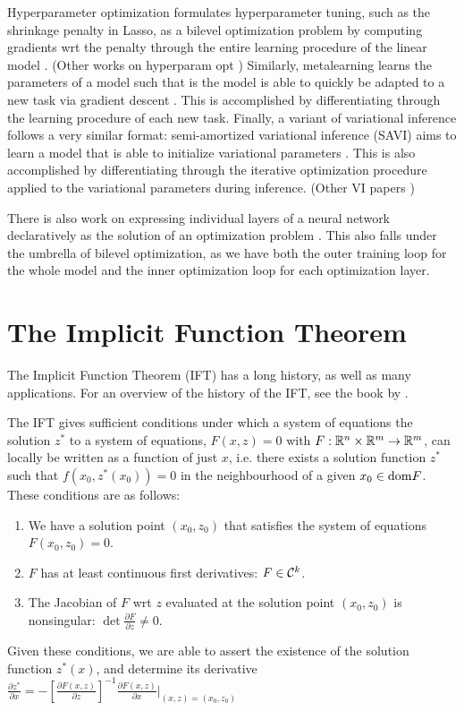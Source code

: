 \documentclass[11pt]{article}
\begin{document}
Hyperparameter optimization formulates hyperparameter tuning, such as the shrinkage penalty in Lasso,
as a bilevel optimization problem by computing gradients wrt the penalty through the entire learning procedure
of the linear model \citep{lorraine2019implasso}.
(Other works on hyperparam opt \citep{maclaurin2015reversible,bertrand2020implicit})
Similarly, metalearning learns the parameters of a model such that is the model is able to quickly
be adapted to a new task via gradient descent \citep{finn2017maml,rajeswaran2019impmaml}.
This is accomplished by differentiating through the learning procedure of each new task.
Finally, a variant of variational inference follows a very similar format:
semi-amortized variational inference (SAVI) aims to learn a model that is able to initialize
variational parameters \citep{kim2018savi}.
This is also accomplished by differentiating through the iterative optimization procedure
applied to the variational parameters during inference.
(Other VI papers \citep{vi,johnson2017pgm})

There is also work on expressing individual layers of a neural network declaratively
as the solution of an optimization problem \citep{optnet,agrawal2019diffcvx,gould2019declarative}.
This also falls under the umbrella of bilevel optimization, as we have both the outer training loop
for the whole model and the inner optimization loop for each optimization layer.

\section{The Implicit Function Theorem}
The Implicit Function Theorem (IFT) has a long history, as well as many applications.
For an overview of the history of the IFT, see the book by \citet{iftbook}.

The IFT gives sufficient conditions under which a system of equations the solution $z^*$
to a system of equations, $F(x, z) = 0$ with $F: \mathbb{R}^n\times\mathbb{R}^m\to\mathbb{R}^m$,
can locally be written as a function of just $x$, i.e. there exists a solution function $z^*$
such that $f(x_0, z^*(x_0)) = 0$ in the neighbourhood of a given $x_0\in\mathrm{dom } F$.
These conditions are as follows:
\begin{enumerate}
\item We have a solution point $(x_0, z_0)$ that satisfies the system of equations
    $F(x_0, z_0) = 0$.
\item $F$ has at least continuous first derivatives: $F \in \mathcal{C}^k$.
\item The Jacobian of $F$ wrt $z$ evaluated at the solution point $(x_0,z_0)$ is nonsingular:
    $\det \frac{\partial F}{\partial z} \neq 0$.
\end{enumerate}
Given these conditions, we are able to assert the existence of the solution function $z^*(x)$,
and determine its derivative
$\frac{\partial z^*}{\partial x} = -[\frac{\partial F(x,z)}{\partial z}]^{-1}
    \frac{\partial F(x,z)}{\partial x} \Bigr\rvert_{(x,z) = (x_0,z_0)}$
\end{document}
